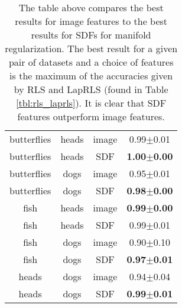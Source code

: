 \documentclass[anon,11pt]{9520} %
\begin{document}
\begin{table}[h!]
\begin{center}
\begin{tabular}{|c|c|c|c|}
butterflies&	heads&	image&	0.99$\pm$0.01\\
butterflies&	heads&	SDF&					\textbf{1.00$\pm$0.00}\\\hline

butterflies&	dogs&	image&			0.95$\pm$0.01\\
butterflies&	dogs&	SDF&					\textbf{0.98$\pm$0.00}\\\hline

fish&	heads&	image&					\textbf{0.99$\pm$0.00}\\
fish&	heads&	SDF&					0.99$\pm$0.01\\\hline

fish&	dogs&	image&					0.90$\pm$0.10\\
fish&	dogs&	SDF&					\textbf{0.97$\pm$0.01}\\\hline

heads&	dogs&	image&					0.94$\pm$0.04\\
heads&	dogs&	SDF&					\textbf{0.99$\pm$0.01}\\\hline

\end{tabular}

\end{center}
\caption{\label{tbl:features} The table above compares the best results for
  image features to the best results for SDFs for manifold regularization. The
  best result for a given pair of datasets and a choice of features is the
  maximum of the accuracies given by RLS and LapRLS (found in Table
  \ref{tbl:rls_laprls}). It is clear that SDF features outperform image
  features.}
\end{table}

\end{document}
